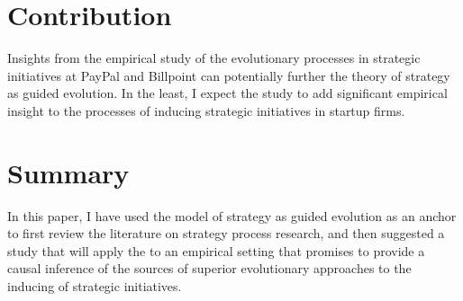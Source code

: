 \documentclass[12pt,letterpaper]{article}
\begin{document}
\section{Contribution}
Insights from the empirical study of the evolutionary processes in strategic initiatives at PayPal and Billpoint can potentially further the theory of strategy as guided evolution. In the least, I expect the study to add significant empirical insight to the processes of inducing strategic initiatives in startup firms.

\section{Summary}
In this paper, I have used the \cite{Lovas2000} model of strategy as guided evolution as an anchor to first review the literature on strategy process research, and then suggested a study that will apply the \cite{Lovas2000} to an empirical setting that promises to provide a causal inference of the sources of superior evolutionary approaches to the inducing of strategic initiatives. 



\begin{singlespace}
\renewcommand{\refname}{REFERENCES}
 

\end{singlespace}
\end{document}
